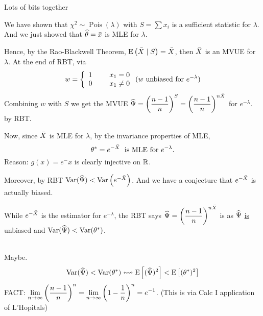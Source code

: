 \begin{enumerate}[label=\textcircled{\raisebox{-1pt}{\arabic*}}]
    \example Lots of bits together
    
    \nl We have shown that $\chi^2 \sim \operatorname{Pois}(\lambda)$ with $S = \sum x_i$ is a sufficient statistic for $\lambda$. And we just showed that $\widehat{\theta} = \bar{x}$ is MLE for $\lambda$. 

    \nl Hence, by the Rao-Blackwell Theorem, $\E{\Xbar \mid S} = \Xbar$, then $\bar{X}$ is an MVUE for $\lambda$. At the end of RBT, via
    $$w = 
    \left\{ \begin{array}{cc}
            1 & \hspace{5mm} x_1 = 0 \\
            0 & \hspace{5mm} x_1 \neq 0
            \end{array} \right. (w \text{ unbiased for } e^{-\lambda})$$
            Combining $w$ with $S$ we get the MVUE $\Psihat = \pfrac*{n-1}{n}^S = \pfrac*{n-1}{n}^{n\Xbar}$ for $e^{-\lambda}$.  \hspace{1mm} by RBT.

            \nl Now, since $\bar{X}$ is MLE for $\lambda$, by the invariance properties of MLE,
            $$\theta^* = e^{-\bar{X}} \; \text{ is MLE for } e^{-\lambda}.$$
            Reason: $g(x) = e^-x$ is clearly injective on $\mathbb{R}$.

            \nl Moreover, by RBT $\Var*{\Psihat} < \Var{e^{-\Xbar}}$. And we have a conjecture that $e^{-\bar{X}}$ is actually biased.

            \nl While $e^{-\bar{X}}$ is the  estimator for $e^{-\lambda}$, the RBT says $\Psihat = \displaystyle \pfrac*{n-1}{n}^{n\Xbar}$ is  \hspace{0.5mm} as $\widehat{\Psi}$ \underline{is} unbiased and $\Var*{\Psihat} < \Var*{\theta^*}$.

            \nl {}
            \\Maybe. 
            $$\Var*{\Psihat} < \Var*{\theta^*} \leftrightsquigarrow \Eb{(\Psihat)^2} < \Eb{(\theta^*)^2}$$
            FACT: $\displaystyle \limn \pfrac*{n-1}{n}^n = \limn \pars{1-\over*{n}}^n = e^{-1}$. (This is via Calc I application of L'Hopitals)


\end{enumerate}
